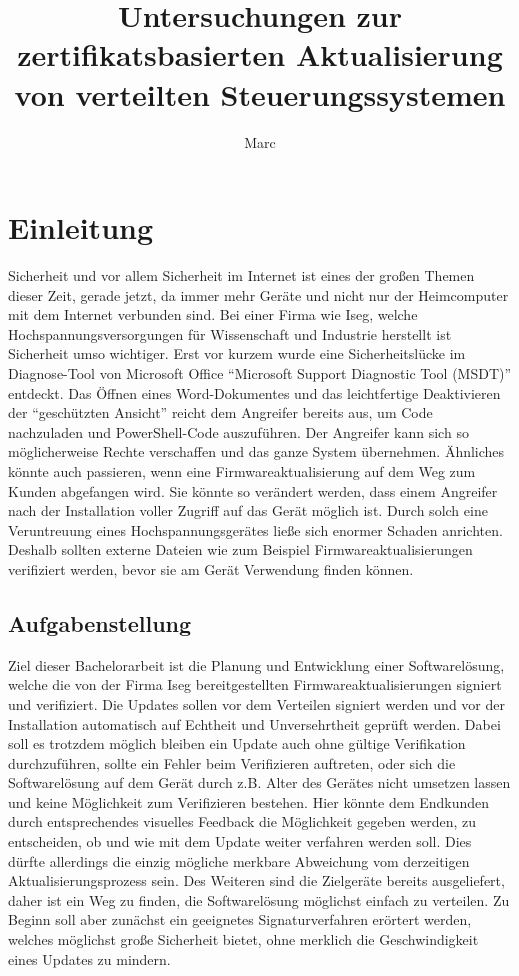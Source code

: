 \documentclass[thesis=bachelor,faculty=cb]{hsmw-thesis}
\title[Research on the certificate-based updating of embedded control systems]{Untersuchungen zur zertifikatsbasierten Aktualisierung von verteilten Steuerungssystemen}
\author{Marc}{Ulbricht}
\begin{document}
\lstlistoflistings
\chapter{Einleitung}
Sicherheit und vor allem Sicherheit im Internet ist eines der großen Themen dieser Zeit, gerade jetzt, da immer mehr Geräte und nicht nur der Heimcomputer mit dem Internet verbunden sind. Bei einer Firma wie Iseg, welche Hochspannungsversorgungen für Wissenschaft und Industrie herstellt ist Sicherheit umso wichtiger. Erst vor kurzem wurde eine Sicherheitslücke \cite{0Day} im Diagnose-Tool von Microsoft Office \enquote{Microsoft Support Diagnostic Tool (MSDT)} entdeckt.
Das Öffnen eines Word-Dokumentes und das leichtfertige Deaktivieren der \enquote{geschützten Ansicht} reicht dem Angreifer bereits aus, um Code nachzuladen und PowerShell-Code auszuführen.
Der Angreifer kann sich so möglicherweise Rechte verschaffen und das ganze System übernehmen. Ähnliches könnte auch passieren, wenn eine Firmwareaktualisierung auf dem Weg zum Kunden abgefangen wird. Sie könnte so verändert werden, dass einem Angreifer nach der Installation voller Zugriff auf das Gerät möglich ist. Durch solch eine Veruntreuung eines Hochspannungsgerätes ließe sich enormer Schaden anrichten. Deshalb sollten externe Dateien wie zum Beispiel Firmwareaktualisierungen verifiziert werden, bevor sie am Gerät Verwendung finden können.
\newpage
\section{Aufgabenstellung}
Ziel dieser Bachelorarbeit ist die Planung und Entwicklung einer Softwarelösung, welche die von der Firma Iseg bereitgestellten Firmwareaktualisierungen signiert und verifiziert. Die Updates sollen vor dem Verteilen signiert werden und vor der Installation automatisch auf Echtheit und Unversehrtheit geprüft werden. Dabei soll es trotzdem möglich bleiben ein Update auch ohne gültige Verifikation durchzuführen, sollte ein Fehler beim Verifizieren auftreten, oder sich die Softwarelösung auf dem Gerät durch z.B. Alter des Gerätes nicht umsetzen lassen und keine Möglichkeit zum Verifizieren bestehen.
\noindent
Hier könnte dem Endkunden durch entsprechendes visuelles Feedback die Möglichkeit gegeben werden, zu entscheiden, ob und wie mit dem Update weiter verfahren werden soll. Dies dürfte allerdings die einzig mögliche merkbare Abweichung vom derzeitigen Aktualisierungsprozess sein.
Des Weiteren sind die Zielgeräte bereits ausgeliefert, daher ist ein Weg zu finden, die Softwarelösung möglichst einfach zu verteilen. 
Zu Beginn soll aber zunächst ein geeignetes Signaturverfahren erörtert werden, welches möglichst große Sicherheit bietet, ohne merklich die Geschwindigkeit eines Updates zu mindern.
\end{document}
